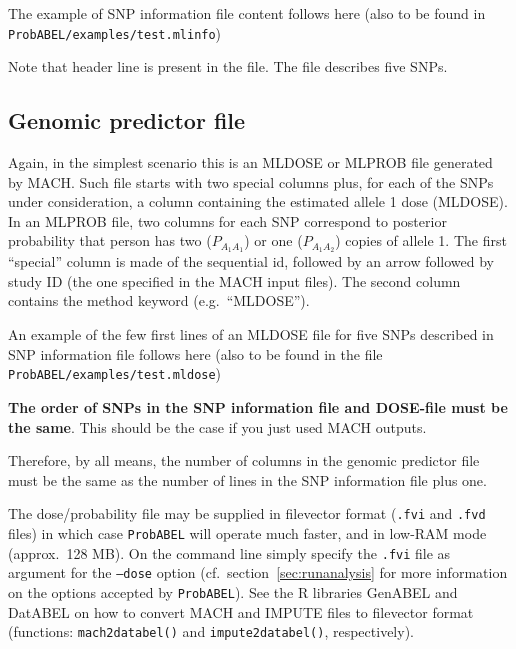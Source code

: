 \documentclass[12pt,a4paper]{article}
\begin{document}
The example of SNP information file content follows here (also
to be found in \texttt{ProbABEL/examples/test.mlinfo})



Note that header line is present in the file. The file describes
five SNPs.

\subsection{Genomic predictor file}
\label{ssec:dosein}

Again, in the simplest scenario this is an MLDOSE or MLPROB file generated by MACH.
Such file starts with two special columns plus, for each of the SNPs
under consideration, a column containing the estimated allele 1 dose (MLDOSE).
In an MLPROB file, two columns for each SNP correspond to posterior probability
that person has two ($P_{A_1A_1}$) or one ($P_{A_1A_2}$) copies of allele 1.
The first ``special'' column is made of the sequential id,
followed by an arrow followed by study ID (the one specified in the
MACH input files). The second column contains the method  keyword
(e.g.~``MLDOSE'').

An example of the few first lines of an MLDOSE file for
five SNPs described in SNP information file follows here (also
to be found in the file \texttt{ProbABEL/examples/test.mldose})




\textbf{The order of SNPs in the SNP information file and DOSE-file
must be the same}. This should be the case if you just used MACH outputs.

Therefore, by all means, the number of columns in the genomic predictor file
must be the same as the number of lines in the SNP information file plus one.

The dose/probability file may be supplied in filevector format
(\texttt{.fvi} and \texttt{.fvd} files) in which case
\texttt{ProbABEL} will operate much faster, and in low-RAM mode
(approx.~128 MB). On the command line simply specify the \texttt{.fvi}
file as argument for the \texttt{--dose} option
(cf.~section~\ref{sec:runanalysis} for more information on the options
accepted by \texttt{ProbABEL}). See the R libraries GenABEL and
DatABEL on how to convert MACH and IMPUTE files to filevector format
(functions: \texttt{mach2databel()} and \texttt{impute2databel()},
respectively).
\end{document}
